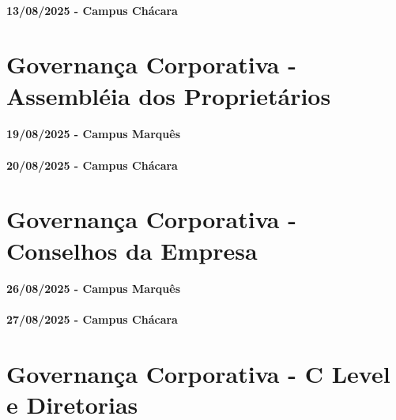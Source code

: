 \documentclass[
]{book}
\begin{document}
\subsubsection*{13/08/2025 - Campus Chácara}\label{campus-chuxe1cara-1}

\chapter{Governança Corporativa - Assembléia dos Proprietários}\label{governanuxe7a-corporativa---assembluxe9ia-dos-proprietuxe1rios}

\subsubsection*{19/08/2025 - Campus Marquês}\label{campus-marquuxeas-2}

\subsubsection*{20/08/2025 - Campus Chácara}\label{campus-chuxe1cara-2}

\chapter{Governança Corporativa - Conselhos da Empresa}\label{governanuxe7a-corporativa---conselhos-da-empresa}

\subsubsection*{26/08/2025 - Campus Marquês}\label{campus-marquuxeas-3}

\subsubsection*{27/08/2025 - Campus Chácara}\label{campus-chuxe1cara-3}

\chapter{Governança Corporativa - C Level e Diretorias}\label{governanuxe7a-corporativa---c-level-e-diretorias}
\end{document}
